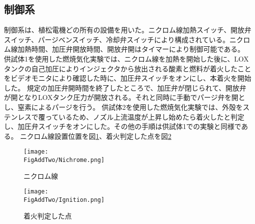 \subsection{制御系}
制御系は、植松電機どの所有の設備を用いた。ニクロム線加熱スイッチ、開放弁スイッチ、パージベンスイッチ、冷却弁スイッチにより構成されている。ニクロム線加熱時間、加圧弁開放時間、開放弁開はタイマーにより制御可能である。
\\
供試体1を使用した燃焼気化実験では、ニクロム線を加熱を開始した後に、LOXタンクの自己加圧によりインジェクタから放出される酸素と燃料が着火したことをビデオモニタにより確認した時に、加圧弁スイッチをオンにし、本着火を開始した。
規定の加圧弁開時間を終了したところで、加圧弁が閉じられて、開放弁が開となりLOXタンク圧力が開放される。それと同時に手動でパージ弁を開とし、窒素によるパージを行う。
供試体2を使用した燃焼気化実験では、外殻をステンレスで覆っているため、ノズル上流温度が上昇し始めたら着火したと判定し、加圧弁スイッチをオンにした。その他の手順は供試体1での実験と同様である。
ニクロム線設置位置を図\ref{fig:Nichrome}、着火判定した点を図\ref{fig:Ignition}
\begin{figure}
\centering
\texttt{[image: \\FigAddTwo/Nichrome.png]}
\caption{ニクロム線}
\label{fig:Nichrome}
\end{figure}
\begin{figure}
\centering
\texttt{[image: \\FigAddTwo/Ignition.png]}
\caption{着火判定した点}
\label{fig:Ignition}
\end{figure}
